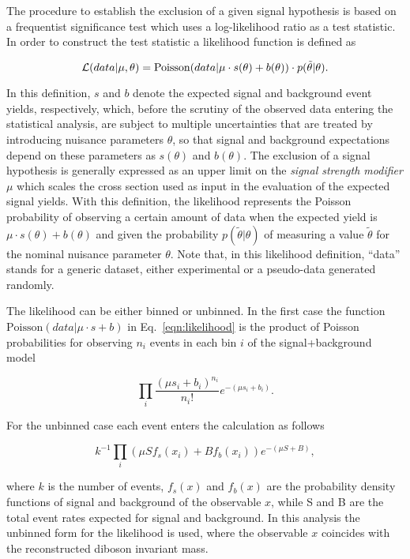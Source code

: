 The procedure to establish the exclusion of a given signal hypothesis is based on a frequentist significance test which uses a log-likelihood ratio as a test statistic.
In order to construct the test statistic a likelihood function is defined as

\begin{equation}\label{eqn:likelihood}
{\cal L}( data | \mu,\theta) = \mathrm{Poisson}(data | \mu\cdot s(\theta) + b(\theta))\cdot p(\tilde{\theta}|\theta).
\end{equation}

In this definition, $s$ and $b$ denote the expected signal and background event yields, respectively,
which, before the scrutiny of the observed data entering the statistical analysis, are subject to multiple uncertainties that are treated by introducing nuisance parameters $\theta$,
so that signal and background expectations depend on these parameters as $s(\theta)$ and $b(\theta)$.
The exclusion of a signal hypothesis is generally expressed as an upper limit on the \textit{signal strength modifier} $\mu$
which scales the cross section used as input in the evaluation of the expected signal yields.
With this definition, the likelihood represents the Poisson probability of observing a certain amount of data when the expected yield is $\mu\cdot s(\theta) + b(\theta)$
and given the probability $p(\tilde{\theta}|\theta)$ of measuring a value $\tilde{\theta}$ for the nominal nuisance parameter $\theta$.
Note that, in this likelihood definition, ``data'' stands for a generic dataset, either experimental or a pseudo-data generated randomly.

The likelihood can be either binned or unbinned. In the first case the function $\mathrm{Poisson}(data | \mu\cdot s + b)$ in Eq.~\ref{eqn:likelihood} is the product of Poisson probabilities
for observing $n_i$ events in each bin $i$ of the signal+background model

\begin{equation}\label{eqn:binned}
\prod_i \frac{(\mu s_{i} +b_{i})^{n_i}}{n_i!}e^{-(\mu s_i + b_i)}.
\end{equation}

For the unbinned case each event enters the calculation as follows

\begin{equation}\label{eqn:unbinned}
k^{-1}\prod_i (\mu S f_s(x_i) + Bf_b(x_i))e^{-(\mu S + B)},
\end{equation}

\noindent where $k$ is the number of events, $f_s(x)$ and $f_b(x)$ are the probability density functions of signal and background of the observable $x$, while S and B are the total event rates expected for signal and background.
In this analysis the unbinned form for the likelihood is used, where the observable $x$ coincides with the reconstructed diboson invariant mass.\\

